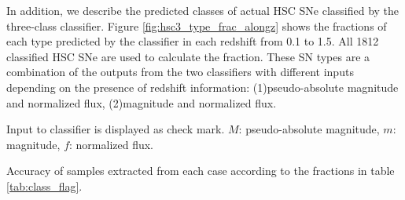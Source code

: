 \documentclass[useamsfonts]{pasj01}
\begin{document}
In addition, we describe the predicted classes of actual HSC SNe classified by the three-class classifier.
Figure \ref{fig:hsc3_type_frac_alongz} shows the fractions of each type predicted by the classifier in each redshift from 0.1 to 1.5.
All 1812 classified HSC SNe are used to calculate the fraction.
These SN types are a combination of the outputs from the two classifiers with different inputs depending on the presence of redshift information: (1)pseudo-absolute magnitude and normalized flux, (2)magnitude and normalized flux.

%
%
%
%
\begin{table}[htbp]
\label{tab:h3_validation}
\begin{tabnote}
\footnotemark[$*$] Input to classifier is displayed as check mark. $M$: pseudo-absolute magnitude, $m$: magnitude, $f$: normalized flux.

\footnotemark[$\dagger$] %
Accuracy of samples extracted from each case according to the fractions in table \ref{tab:class_flag}.
\end{tabnote}
\end{table}
\end{document}
